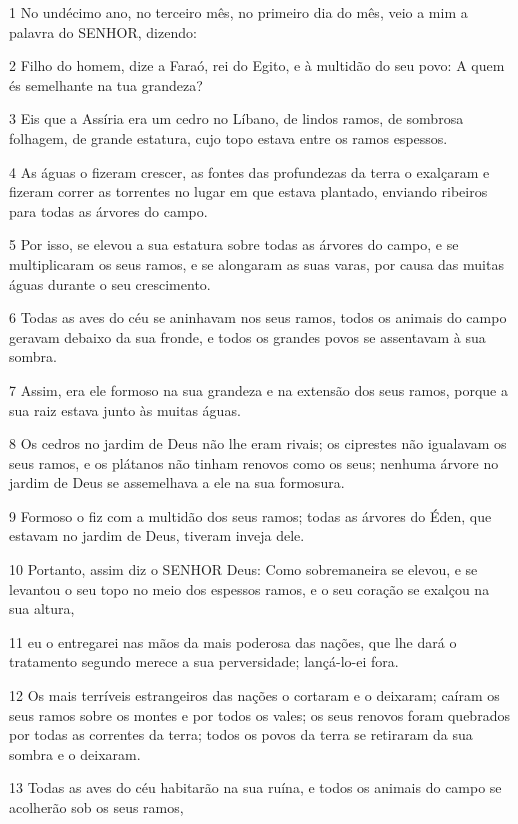 \par 1 No undécimo ano, no terceiro mês, no primeiro dia do mês, veio a mim a palavra do SENHOR, dizendo:
\par 2 Filho do homem, dize a Faraó, rei do Egito, e à multidão do seu povo: A quem és semelhante na tua grandeza?
\par 3 Eis que a Assíria era um cedro no Líbano, de lindos ramos, de sombrosa folhagem, de grande estatura, cujo topo estava entre os ramos espessos.
\par 4 As águas o fizeram crescer, as fontes das profundezas da terra o exalçaram e fizeram correr as torrentes no lugar em que estava plantado, enviando ribeiros para todas as árvores do campo.
\par 5 Por isso, se elevou a sua estatura sobre todas as árvores do campo, e se multiplicaram os seus ramos, e se alongaram as suas varas, por causa das muitas águas durante o seu crescimento.
\par 6 Todas as aves do céu se aninhavam nos seus ramos, todos os animais do campo geravam debaixo da sua fronde, e todos os grandes povos se assentavam à sua sombra.
\par 7 Assim, era ele formoso na sua grandeza e na extensão dos seus ramos, porque a sua raiz estava junto às muitas águas.
\par 8 Os cedros no jardim de Deus não lhe eram rivais; os ciprestes não igualavam os seus ramos, e os plátanos não tinham renovos como os seus; nenhuma árvore no jardim de Deus se assemelhava a ele na sua formosura.
\par 9 Formoso o fiz com a multidão dos seus ramos; todas as árvores do Éden, que estavam no jardim de Deus, tiveram inveja dele.
\par 10 Portanto, assim diz o SENHOR Deus: Como sobremaneira se elevou, e se levantou o seu topo no meio dos espessos ramos, e o seu coração se exalçou na sua altura,
\par 11 eu o entregarei nas mãos da mais poderosa das nações, que lhe dará o tratamento segundo merece a sua perversidade; lançá-lo-ei fora.
\par 12 Os mais terríveis estrangeiros das nações o cortaram e o deixaram; caíram os seus ramos sobre os montes e por todos os vales; os seus renovos foram quebrados por todas as correntes da terra; todos os povos da terra se retiraram da sua sombra e o deixaram.
\par 13 Todas as aves do céu habitarão na sua ruína, e todos os animais do campo se acolherão sob os seus ramos,
